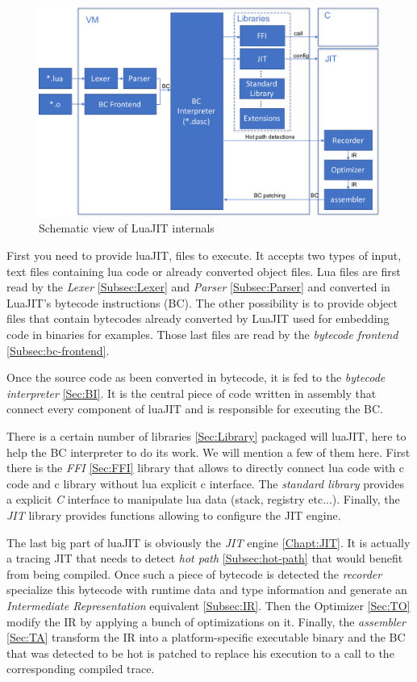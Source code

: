 \begin{figure}[H]
    \centering
	\includegraphics[width=\textwidth]{./Images/LuaJIT.pdf}
    \caption{Schematic view of LuaJIT internals}
    \label{fig:luajit-internal}
\end{figure}{}

First you need to provide luaJIT, files to execute. It accepts two types of input,
text files containing lua code or already converted object files. Lua files are
first read by the \emph{Lexer} \ref{Subsec:Lexer} and \emph{Parser} \ref{Subsec:Parser} and
converted in LuaJIT's bytecode instructions (BC). The other possibility is to provide
object files that contain bytecodes already converted by LuaJIT used for
embedding code in binaries for examples. Those last files are read by the
\emph{bytecode frontend} \ref{Subsec:bc-frontend}.

Once the source code as been converted in bytecode, it is fed to the \emph{bytecode
interpreter} \ref{Sec:BI}. It is the central piece of code written in assembly
that connect every component of luaJIT and is responsible for executing the BC.

There is a certain number of libraries \ref{Sec:Library} packaged will luaJIT, here
to help the BC interpreter to do its work. We will mention a few of them here.
First there is the \emph{FFI} \ref{Sec:FFI} library that allows to directly connect lua
code with c code and c library without lua explicit c interface. The \emph{standard
library} provides a explicit \emph{C} interface to manipulate lua data
(stack, registry etc...). Finally, the \emph{JIT} library provides functions
allowing to configure the JIT engine.

The last big part of luaJIT is obviously the \emph{JIT} engine \ref{Chapt:JIT}.
It is actually a tracing JIT that needs to detect \emph{hot path}
\ref{Subsec:hot-path} that would benefit from being compiled. Once such a piece
of bytecode is detected the \emph{recorder} specialize this bytecode with runtime
data and type information and generate an \emph{Intermediate Representation}
equivalent \ref{Subsec:IR}. Then the Optimizer \ref{Sec:TO} modify the IR by
applying a bunch of optimizations on it. Finally, the \emph{assembler} \ref{Sec:TA}
transform the IR into a platform-specific executable binary and the BC that was
detected to be hot is patched to replace his execution to a call to the
corresponding compiled trace.
